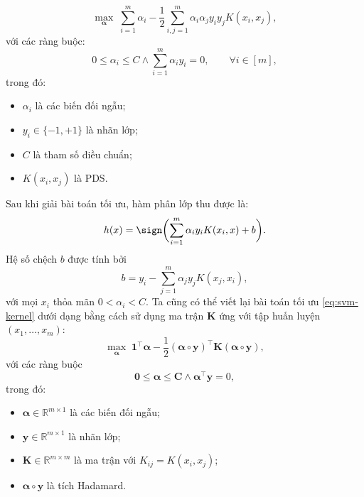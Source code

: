 \begin{equation}
\label{eq:svm-kernel}
\max_{\boldsymbol{\alpha}}
\;
\sum_{i=1}^{m}\alpha_i
-
\frac{1}{2}
\sum_{i,j=1}^{m}
\alpha_i\alpha_j y_i y_j K(x_i,x_j),
\end{equation}
với các ràng buộc:
\begin{equation}
0 \le \alpha_i \le C
\wedge
\sum_{i=1}^{m}\alpha_i y_i = 0,
\qquad
\forall i \in [m],
\end{equation}
trong đó:
\begin{itemize}
    \item $\alpha_i$ là các biến đối ngẫu;
    \item $y_i \in \{-1,+1\}$ là nhãn lớp;
    \item $C$ là tham số điều chuẩn;
    \item $K(x_i,x_j)$ là \protect{} PDS.
\end{itemize}
Sau khi giải bài toán tối ưu, hàm phân lớp thu được là:
\begin{equation}
\label{eq:kernel-hypothesis}
h(x)
=
\sign\biggl(
\sum_{i=1}^{m}\alpha_i y_i K(x_i,x)
+ b
\biggr).
\end{equation}
Hệ số chệch $b$ được tính bởi
\begin{equation}
b = y_i - \sum_{j=1}^{m}\alpha_j y_j K(x_j,x_i),
\end{equation}
với mọi $x_i$ thỏa mãn $0 < \alpha_i < C$.
Ta cũng có thể viết lại bài toán tối ưu
\eqref{eq:svm-kernel}
dưới dạng  bằng cách sử dụng ma trận
\protect{} $\mathbf{K}$ ứng với tập huấn luyện
$(x_1,\dots,x_m)$:
\begin{equation}
\max_{\boldsymbol{\alpha}}
\;
\mathbf{1}^{\intercal}\boldsymbol{\alpha}
-
\frac{1}{2}
(\boldsymbol{\alpha}\circ\mathbf{y})^{\intercal}
\mathbf{K}
(\boldsymbol{\alpha}\circ\mathbf{y}),
\end{equation}
với các ràng buộc
\begin{equation}
\mathbf{0}
\le
\boldsymbol{\alpha}
\le
\mathbf{C}
\wedge
\boldsymbol{\alpha}^{\intercal}\mathbf{y}
= 0,
\end{equation}
trong đó:
\begin{itemize}
    \item $\boldsymbol{\alpha}\in\mathbb{R}^{m\times1}$ là  các biến đối ngẫu;
    \item $\mathbf{y}\in\mathbb{R}^{m\times1}$ là  nhãn lớp;
    \item $\mathbf{K}\in\mathbb{R}^{m\times m}$ là ma trận \protect{} với
    $K_{ij}=K(x_i,x_j)$;
    \item $\boldsymbol{\alpha}\circ\mathbf{y}$ là tích Hadamard.
\end{itemize}

